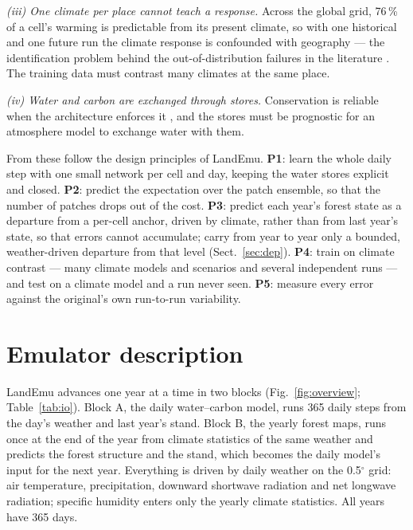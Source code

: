 \documentclass[11pt,a4paper]{article}
\begin{document}
\emph{(iii) One climate per place cannot teach a response.} Across the global grid, 76\,\% of a cell's warming is
predictable from its present climate, so with one historical and one future run the climate response is confounded
with geography --- the identification problem behind the out-of-distribution failures in the literature
\citep{R00289,R00430}. The training data must contrast many climates at the same place.

\emph{(iv) Water and carbon are exchanged through stores.} Conservation is reliable when the architecture enforces it
\citep{R00532,R00755}, and the stores must be prognostic for an atmosphere model to exchange water with them.

From these follow the design principles of LandEmu. \textbf{P1}: learn the whole daily step with one small network per
cell and day, keeping the water stores explicit and closed. \textbf{P2}: predict the expectation over the patch
ensemble, so that the number of patches drops out of the cost. \textbf{P3}: predict each year's forest state as a
departure from a per-cell anchor, driven by climate, rather than from last year's state, so that errors cannot
accumulate; carry from year to year only a bounded, weather-driven departure from that level (Sect.~\ref{sec:dep}).
\textbf{P4}: train on climate contrast --- many climate models and scenarios and several independent runs --- and test
on a climate model and a run never seen. \textbf{P5}: measure every error against the original's own run-to-run
variability.

\section{Emulator description}\label{sec:model}

LandEmu advances one year at a time in two blocks (Fig.~\ref{fig:overview}; Table~\ref{tab:io}). Block A, the daily
water--carbon model, runs 365 daily steps from the day's weather and last year's stand. Block B, the yearly forest
maps, runs once at the end of the year from climate statistics of the same weather and predicts the forest structure
and the stand, which becomes the daily model's input for the next year. Everything is driven by daily weather on the
0.5$^\circ$ grid: air temperature, precipitation, downward shortwave radiation and net longwave radiation; specific
humidity enters only the yearly climate statistics. All years have 365 days.
\end{document}
